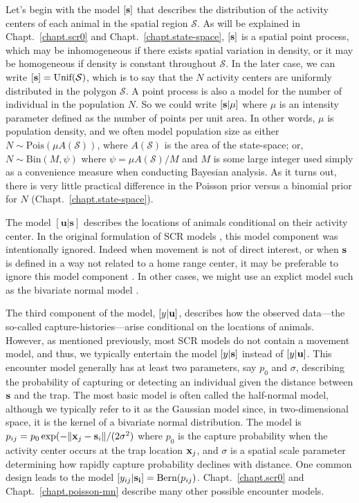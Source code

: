 Let's begin with the model $[{\bf s}]$ that describes the
distribution of the activity centers of each animal in the
spatial region $\mathcal{S}$.
As will be explained in Chapt.~\ref{chapt.scr0} and
Chapt.~\ref{chapt.state-space}, $[{\bf s}]$ is a spatial point process, which may be
inhomogeneous if there exists spatial variation in density, or it may
be homogeneous if density is constant throughout $\mathcal{S}$. In the
later case, we can write $[{\bf s}] = \text{Unif}(\mathcal{S})$, which
is to say that the $N$ activity centers are uniformly distributed in
the polygon $\mathcal{S}$. A point process is also a model for the
number of individual in the population $N$. So
we could write $[{\bf s}|\mu]$ where $\mu$ is an intensity
parameter defined as the number of points per unit area. In other
words, $\mu$ is population density, and we often model population size
as either $N \sim \text{Pois}(\mu A(\mathcal{S}))$, where
$A(\mathcal{S})$ is the area of the state-space; or,
$N \sim \text{Bin}(M, \psi)$ where $\psi = \mu A(\mathcal{S}) / M$ and
$M$ is some large integer used simply as a convenience measure when
conducting Bayesian analysis. As it turns out, there is very little
practical difference in the Poisson prior versus a binomial prior for
$N$ (Chapt.~\ref{chapt.state-space}).

The model $[\mathbf{u}|\mathbf{s}]$ describes the locations of
animals conditional on their activity center. In the original
formulation of SCR models \citep{efford:2004}, this model component
was intentionally ignored. Indeed when movement is not of direct
interest, or when $\bf s$ is defined in a way not related to a home
range center, it may be preferable to ignore this model component
\citep{borchers:2011}. In other cases, we might use an explict model
such as the bivariate normal model \citep{royle_young:2008}.

The third component of the model, $[y|{\bf u}]$, describes how the
observed data---the so-called capture-histories---arise conditional on
the locations of animals. However, as mentioned previously, most SCR
models do not contain a movement model, and thus, we typically entertain
the model $[y|{\bf s}]$ instead of $[y|{\bf u}]$.
This encounter model
generally has at least two parameters, say $p_0$ and $\sigma$, describing the probability of
capturing or detecting an individual given the distance between $\bf
s$ and the trap. The most basic model is
often called the half-normal model, although we typically refer to it as the
Gaussian model since, in two-dimensional space, it is the kernel of a
bivariate normal distribution. The model is
$p_{ij} = p_0\exp(-\|{\bf x}_j - {\bf s}_i\| / (2\sigma^2)$ where
$p_0$ is the capture probability when the activity center occurs at
the trap location ${\bf x}_j$, and $\sigma$ is a spatial scale
parameter determining how rapidly capture probability declines with
distance. One common design leads to the model
$[y_{ij}|{\bf s_i}] =  \text{Bern}(p_{ij})$. Chapt.~\ref{chapt.scr0} and
Chapt.~\ref{chapt.poisson-mn} describe many other possible encounter models.

